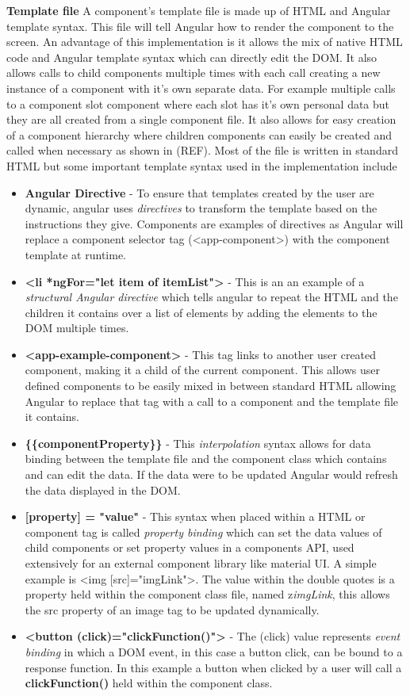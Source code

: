 \documentclass{l4proj}
\begin{document}
\textbf{Template file}
A component's template file is made up of HTML and Angular template syntax. This file will tell Angular how to render the component to the screen. An advantage of this implementation is it allows the mix of native HTML code and Angular template syntax which can directly edit the DOM. It also allows calls to child components multiple times with each call creating a new instance of a component with it's own separate data. For example multiple calls to a component slot component where each slot has it's own personal data but they are all created from a single component file. It also allows for easy creation of a component hierarchy where children components can easily be created and called when necessary as shown in (REF). Most of the file is written in standard HTML but some important template syntax used in the implementation include
\begin{itemize}
    \item \textbf{Angular Directive} - To ensure that templates created by the user are dynamic, angular uses \emph{directives} to transform the template based on the instructions they give. Components are examples of directives as Angular will replace a component selector tag (<app-component>) with the component template at runtime. 
    \item \textbf{<li *ngFor="let item of itemList">} - This is an an example of a \emph{structural Angular directive} which tells angular to repeat the HTML and the children it contains over a list of elements by adding the elements to the DOM multiple times. 
    \item \textbf{<app-example-component>} - This tag links to another user created component, making it a child of the current component. This allows user defined components to be easily mixed in between standard HTML allowing Angular to replace that tag with a call to a component and the template file it contains.
    \item \textbf{ \{\{componentProperty\}\}} - This \emph{interpolation} syntax allows for data binding between the template file and the component class which contains and can edit the data. If the data were to be updated Angular would refresh the data displayed in the DOM.
    \item \textbf{[property] = "value"} - This syntax when placed within a HTML or component tag is called \emph{property binding} which can set the data values of child components or set property values in a components API, used extensively for an external component library like material UI. A simple example is <img [src]="imgLink">. The value within the double quotes is a property held within the component class file, named z\emph{imgLink}, this allows the src property of an image tag to be updated dynamically.
    \item \textbf{<button (click)="clickFunction()">} - The (click) value represents \emph{event binding} in which a DOM event, in this case a button click, can be bound to a response function. In this example a button when clicked by a user will call a \textbf{clickFunction()} held within the component class. 
\end{itemize}
\end{document}
